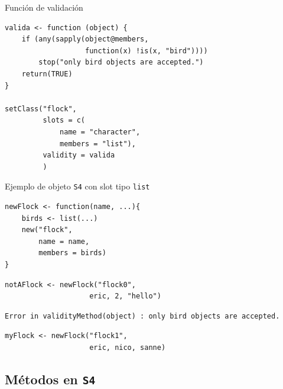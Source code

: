 \documentclass[xcolor={usenames,svgnames,dvipsnames}]{beamer}
\begin{document}
\begin{frame}[label={sec:org0ca83fc},fragile]{Función de validación}
 \lstset{language=r,label= ,caption= ,captionpos=b,numbers=none}
\begin{lstlisting}
valida <- function (object) {
    if (any(sapply(object@members,
                   function(x) !is(x, "bird")))) 
        stop("only bird objects are accepted.")
    return(TRUE)
}

setClass("flock",
         slots = c(
             name = "character",
             members = "list"),
         validity = valida
         )
\end{lstlisting}
\end{frame}

\begin{frame}[label={sec:org8576ba5},fragile]{Ejemplo de objeto \texttt{S4} con slot tipo \texttt{list}}
 \lstset{language=r,label= ,caption= ,captionpos=b,numbers=none}
\begin{lstlisting}
newFlock <- function(name, ...){
    birds <- list(...)
    new("flock",
        name = name,
        members = birds)
}
\end{lstlisting}

\lstset{language=r,label= ,caption= ,captionpos=b,numbers=none}
\begin{lstlisting}
notAFlock <- newFlock("flock0",
                    eric, 2, "hello")
\end{lstlisting}

\begin{verbatim}
Error in validityMethod(object) : only bird objects are accepted.
\end{verbatim}


\lstset{language=r,label= ,caption= ,captionpos=b,numbers=none}
\begin{lstlisting}
myFlock <- newFlock("flock1",
                    eric, nico, sanne)
\end{lstlisting}
\end{frame}

\subsection{Métodos en \texttt{S4}}
\label{sec:orgb58d5fe}
\end{document}
